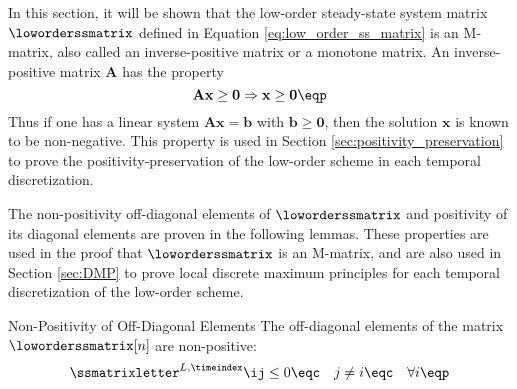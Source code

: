 In this section, it will be shown that the low-order steady-state system matrix
$\loworderssmatrix$ defined in Equation \eqref{eq:low_order_ss_matrix} is an M-matrix, also
called an inverse-positive matrix or a monotone matrix. An inverse-positive
matrix $\mathbf{A}$ has the property
\begin{equation}\label{eq:m_matrix}
  \mathbf{A}\mathbf{x} \geq \mathbf{0} \Rightarrow \mathbf{x} \geq \mathbf{0} \eqp
\end{equation}
Thus if one has a linear system $\mathbf{A}\mathbf{x} = \mathbf{b}$ with
$\mathbf{b} \geq \mathbf{0}$, then the solution $\mathbf{x}$
is known to be non-negative.
This property is used in Section \ref{sec:positivity_preservation}
to prove the positivity-preservation of the low-order scheme in each
temporal discretization.

The non-positivity off-diagonal elements of $\loworderssmatrix$ and
positivity of its diagonal elements are proven in the following
lemmas. These properties are used in the proof that $\loworderssmatrix$
is an M-matrix, and are also used in Section \ref{sec:DMP} to
prove local discrete maximum principles for each temporal discretization
of the low-order scheme.
\begin{lemma}{Non-Positivity of Off-Diagonal Elements}
   The off-diagonal elements of the matrix $\loworderssmatrix[n]$ are non-positive:
   \[
     \ssmatrixletter^{L,\timeindex}\ij\le 0 \eqc \quad j\ne i
       \eqc \quad \forall i\eqp
   \]
\end{lemma}


